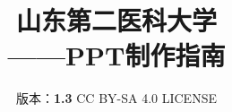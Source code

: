 

\title{%
    {\Huge\textbf{山东第二医科大学\\[5pt]——PPT制作指南}}%
}
\author{%
    版本：\textbf{1.3} \qquad%
    CC BY-SA 4.0 LICENSE \qquad%
    }
\date{\CurrentCustomTime}
\maketitle

\renewcommand{\thefootnote}{\arabic{footnote}}
